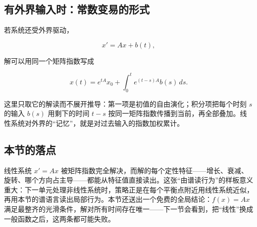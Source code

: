 \subsection{有外界输入时：常数变易的形式}

若系统还受外界驱动，

\[
x'=Ax+b(t),
\]

解可以用同一个矩阵指数写成

\[
x(t)=e^{tA}x_0+\int_0^t e^{(t-s)A}b(s)\,ds.
\]

这里只取它的解读而不展开推导：第一项是初值的自由演化；积分项把每个时刻 \(s\) 的输入 \(b(s)\) 用剩下的时间 \(t-s\) 按同一矩阵指数传播到当前，再全部叠加。线性系统对外界的``记忆''，就是对过去输入的指数加权累计。

\subsection{本节的落点}

线性系统 \(x'=Ax\) 被矩阵指数完全解决，而解的每个定性特征——增长、衰减、旋转、哪个方向占主导——都能从特征值直接读出。这张``由谱读行为''的样板意义重大：下一单元处理非线性系统时，策略正是在每个平衡点附近用线性系统近似，再用本节的谱语言读出局部行为。本节还送出一个免费的全局结论：\(f(x)=Ax\) 满足最整齐的光滑条件，解对所有时间存在唯一——下一节会看到，把``线性''换成一般函数之后，这两条都可能失败。
